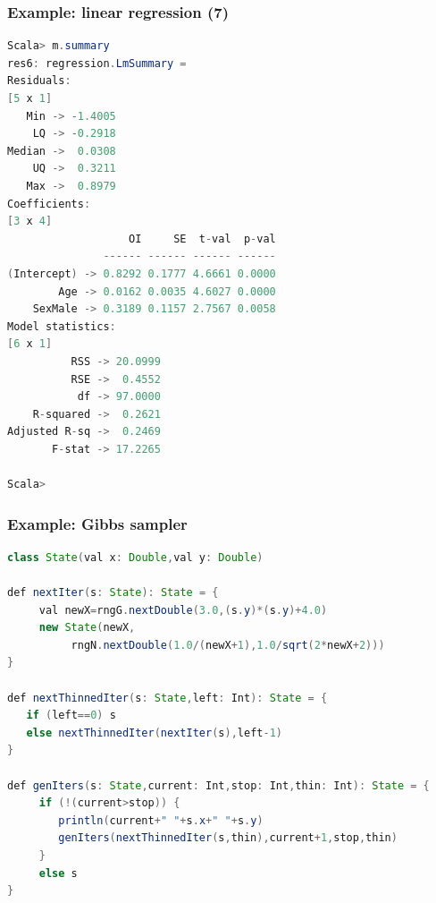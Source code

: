 \documentclass[mathserif,handout]{beamer}
\begin{document}


\begin{frame}[fragile]
\frametitle{Example: linear regression (7)}
{\scriptsize
\begin{lstlisting}[language=java]
Scala> m.summary
res6: regression.LmSummary =
Residuals:
[5 x 1]
   Min -> -1.4005
    LQ -> -0.2918
Median ->  0.0308
    UQ ->  0.3211
   Max ->  0.8979
Coefficients:
[3 x 4]
                   OI     SE  t-val  p-val
               ------ ------ ------ ------
(Intercept) -> 0.8292 0.1777 4.6661 0.0000
        Age -> 0.0162 0.0035 4.6027 0.0000
    SexMale -> 0.3189 0.1157 2.7567 0.0058
Model statistics:
[6 x 1]
          RSS -> 20.0999
          RSE ->  0.4552
           df -> 97.0000
    R-squared ->  0.2621
Adjusted R-sq ->  0.2469
       F-stat -> 17.2265

Scala> 
\end{lstlisting}
}
\end{frame}


\begin{frame}[fragile]
\frametitle{Example: Gibbs sampler}
{\scriptsize
\begin{lstlisting}[language=java]
class State(val x: Double,val y: Double)
 
def nextIter(s: State): State = {
     val newX=rngG.nextDouble(3.0,(s.y)*(s.y)+4.0)
     new State(newX, 
          rngN.nextDouble(1.0/(newX+1),1.0/sqrt(2*newX+2)))
}
 
def nextThinnedIter(s: State,left: Int): State = {
   if (left==0) s 
   else nextThinnedIter(nextIter(s),left-1)
}
 
def genIters(s: State,current: Int,stop: Int,thin: Int): State = {
     if (!(current>stop)) {
        println(current+" "+s.x+" "+s.y)
        genIters(nextThinnedIter(s,thin),current+1,stop,thin)
     }
     else s
}
\end{lstlisting}
}
\end{frame}
\end{document}

